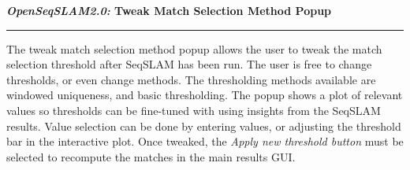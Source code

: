 \centerline{\textbf{\textit{OpenSeqSLAM2.0:} Tweak Match Selection Method Popup}}
\noindent\rule{\textwidth}{2pt}
\bigskip
\parbox{\textwidth}{The tweak match selection method popup allows the user to tweak the match selection threshold after SeqSLAM has been run. The user is free to change thresholds, or even change methods. The thresholding methods available are windowed uniqueness, and basic thresholding. The popup shows a plot of relevant values so thresholds can be fine-tuned with using insights from the SeqSLAM results. Value selection can be done by entering values, or adjusting the threshold bar in the interactive plot. Once tweaked, the \textit{Apply new threshold button} must be selected to recompute the matches in the main results GUI.}
